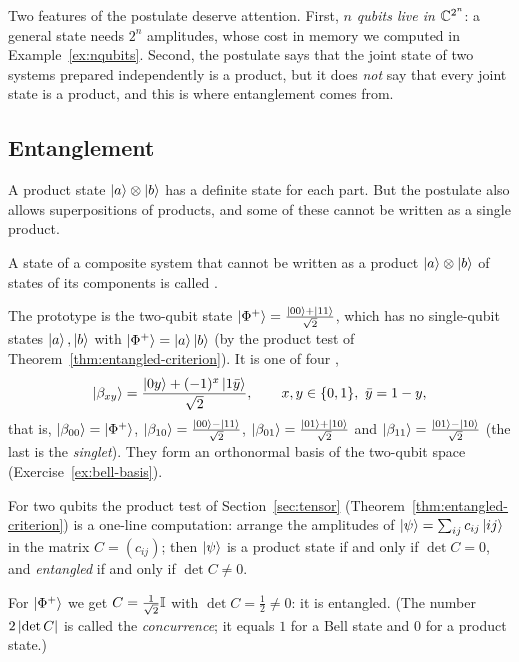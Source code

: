 Two features of the postulate deserve attention. First, \emph{$n$ qubits live in $\mathbb{C}^{2^n}$}: a general state needs $2^n$ amplitudes, whose cost in memory we computed in Example~\ref{ex:nqubits}. Second, the postulate says that the joint state of two systems prepared independently is a product, but it does \emph{not} say that every joint state is a product, and this is where entanglement comes from.

\subsection{Entanglement}

A product state $\left|a\right\rangle\otimes\left|b\right\rangle$ has a definite state for each part. But the postulate also allows superpositions of products, and some of these cannot be written as a single product.

\begin{definition}[Entanglement]\label{def:entangled}
  A state of a composite system that cannot be written as a product $\left|a\right\rangle\otimes\left|b\right\rangle$ of states of its components is called .
\end{definition}

The prototype is the two-qubit state $\left|\Phi^+\right\rangle=\frac{\left|00\right\rangle+\left|11\right\rangle}{\sqrt2}$, which has no single-qubit states $\left|a\right\rangle,\left|b\right\rangle$ with $\left|\Phi^+\right\rangle=\left|a\right\rangle\left|b\right\rangle$ (by the product test of Theorem~\ref{thm:entangled-criterion}). It is one of four ,
\[
  \bell xy=\frac{\ket{0y}+(-1)^x\ket{1\bar y}}{\sqrt2},\qquad x,y\in\{0,1\},\ \bar y=1-y,
\]
that is, $\left|\beta_{00}\right\rangle=\left|\Phi^+\right\rangle$, $\left|\beta_{10}\right\rangle=\frac{\left|00\right\rangle-\left|11\right\rangle}{\sqrt2}$, $\left|\beta_{01}\right\rangle=\frac{\left|01\right\rangle+\left|10\right\rangle}{\sqrt2}$ and $\left|\beta_{11}\right\rangle=\frac{\left|01\right\rangle-\left|10\right\rangle}{\sqrt2}$ (the last is the \emph{singlet}). They form an orthonormal basis of the two-qubit space (Exercise~\ref{ex:bell-basis}).

For two qubits the product test of Section~\ref{sec:tensor} (Theorem~\ref{thm:entangled-criterion}) is a one-line computation: arrange the amplitudes of $\left|\psi\right\rangle=\sum_{ij}c_{ij}\left|ij\right\rangle$ in the matrix $C=(c_{ij})$; then $\left|\psi\right\rangle$ is a product state if and only if $\det C=0$, and \emph{entangled} if and only if $\det C\neq0$.

For $\left|\Phi^+\right\rangle$ we get $C=\tfrac1{\sqrt2}\mathbb{I}$ with $\det C=\tfrac12\neq0$: it is entangled. (The number $2\left|\det C\right|$ is called the \emph{concurrence}; it equals $1$ for a Bell state and $0$ for a product state.)

